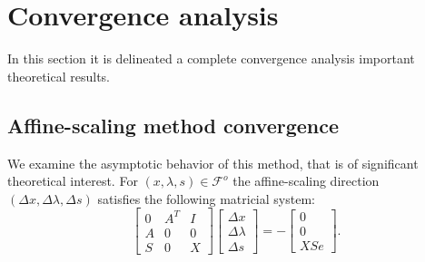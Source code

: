 \documentclass[a4paper,10 pt,titlepage,twoside]{book}
\theoremstyle{plain}
\theoremstyle{definition}
\theoremstyle{remark}
\begin{document}
\chapter{Convergence analysis}
In this section it is delineated a complete convergence analysis important theoretical results. 
\section{Affine-scaling method convergence}
We examine the asymptotic behavior of this method, that is of significant theoretical interest.  For $(x, \lambda, s)\in\mathcal{F}^{o}$ the affine-scaling direction $(\Delta x, \Delta \lambda, \Delta s)$ satisfies the following matricial system:\\
\begin{equation}\label{5.1}
\begin{bmatrix}
0&A^{T}&I \\A&0&0\\S&0&X
\end{bmatrix}\begin{bmatrix}
\Delta x\\\Delta\lambda \\\Delta s
\end{bmatrix}=-\begin{bmatrix}
0\\0\\XSe
\end{bmatrix}.
\end{equation}\\
	
\end{document}
